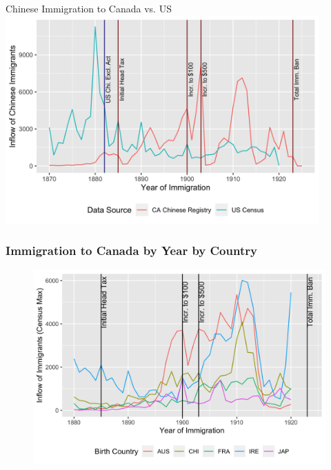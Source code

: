 \documentclass[pdf]{beamer}
\begin{document}
\begin{frame}[label = yrimmchius]{Chinese Immigration to Canada vs. US}
    \centering
    \includegraphics[width = 0.9\textwidth]{../../figs/yrimmchi_us.png}
    \hyperlink{yrimm_us}{}
\end{frame}

\begin{frame}[label = yrimmall]
	\frametitle{Immigration to Canada by Year by Country}
    \centering
	\begin{figure}[H]
		\begin{center}
			\includegraphics[width=\textwidth]{../../figs/yrimmall.png}
		\end{center}
	\end{figure}
\end{frame}
\end{document}
